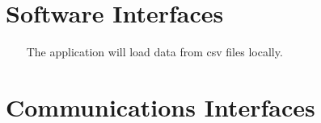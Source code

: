 \documentclass{report}
\begin{document}
\section{Software Interfaces} ~~~
The application will load data from csv files locally.


\section{Communications Interfaces} ~~~
\end{document}
